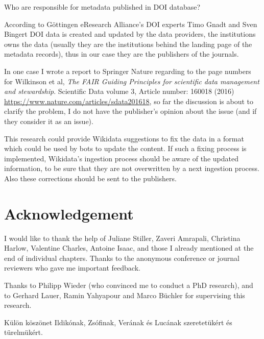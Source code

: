 Who are responsible for metadata published in DOI database?

According to Göttingen eResearch Alliance's DOI experts Timo Gnadt and Sven Bingert DOI data is created and updated by the data providers, the institutions owns the data (usually they are the institutions behind the landing page of the metadata records), thus in our case they are the publishers of the journals.

In one case I wrote a report to Springer Nature regarding to the page numbers for Wilkinson et al, \emph{The FAIR Guiding Principles for scientific data management and stewardship}. Scientific Data volume 3, Article number: 160018 (2016) \url{https://www.nature.com/articles/sdata201618}, so far the discussion is about to clarify the problem, I do not have the publisher's opinion about the issue (and if they consider it as an issue).

This research could provide Wikidata suggestions to fix the data in a format which could be used by bots to update the content. If such a fixing process is implemented, Wikidata's ingestion process should be aware of the updated information, to be sure that they are not overwritten by a next ingestion process. Also these corrections should be sent to the publishers.

\section{Acknowledgement}

I would like to thank the help of Juliane Stiller, Zaveri Amrapali, Christina Harlow, Valentine Charles, Antoine Isaac, and those I already mentioned at the end of individual chapters. Thanks to the anonymous conference or journal reviewers who gave me important feedback.

Thanks to Philipp Wieder (who convinced me to conduct a PhD research), and to Gerhard Lauer, Ramin Yahyapour and Marco Büchler for supervising this research.



Külön köszönet Ildikónak, Zsófinak, Verának és Lucának szeretetükért és türelmükért.